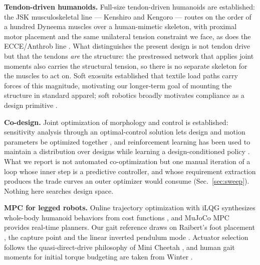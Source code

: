 \documentclass[conference]{IEEEtran}
\begin{document}
\textbf{Tendon-driven humanoids.} Full-size tendon-driven humanoids are
established: the JSK musculoskeletal line --- Kenshiro
\cite{nakanishi2013kenshiro} and Kengoro \cite{asano2017kengoro} --- routes on
the order of a hundred Dyneema muscles over a human-mimetic skeleton, with
proximal motor placement and the same unilateral tension constraint we face,
as does the ECCE/Anthrob line \cite{wittmeier2013anthropomimetic}. What
distinguishes the present design is not tendon drive but that the tendons
\emph{are} the structure: the prestressed network that applies joint moments
also carries the structural tension, so there is no separate skeleton for the
muscles to act on. Soft exosuits \cite{quinlivan2017exosuit} established that
textile load paths carry forces of this magnitude, motivating our longer-term
goal of mounting the structure in standard apparel; soft robotics broadly
motivates compliance as a design primitive \cite{rus2015soft}.

\textbf{Co-design.} Joint optimization of morphology and control is
established: sensitivity analysis through an optimal-control solution lets
design and motion parameters be optimized together \cite{ha2018codesign}, and
reinforcement learning has been used to maintain a distribution over designs
while learning a design-conditioned policy \cite{schaff2019jointly}. What we
report is not automated co-optimization but one manual iteration of a loop
whose inner step is a predictive controller, and whose requirement extraction
produces the trade curves an outer optimizer would consume
(Sec.~\ref{sec:sweep}). Nothing here searches design space.

\textbf{MPC for legged robots.} Online trajectory optimization with iLQG
synthesizes whole-body humanoid behaviors from cost functions
\cite{tassa2012synthesis,tassa2014control}, and MuJoCo MPC
\cite{howell2022mjpc} provides real-time planners. Our gait reference draws on
Raibert's foot placement \cite{raibert1986legged}, the capture point
\cite{pratt2006capture} and the linear inverted pendulum mode
\cite{kajita2001lipm}. Actuator selection follows the quasi-direct-drive
philosophy of Mini Cheetah \cite{katz2019minicheetah}, and human gait moments
for initial torque budgeting are taken from Winter
\cite{winter2009biomechanics}.
\end{document}
